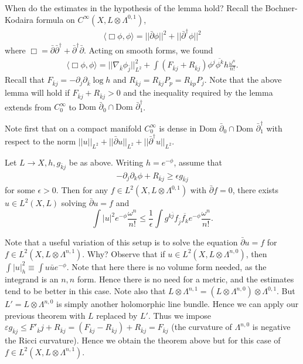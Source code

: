 \documentclass{../mathnotes}
\begin{document}
When do the estimates in the hypothesis of the lemma hold? Recall the Bochner-Kodaira formula on $C^\infty(X,L\otimes\Lambda^{0,1})$,
\begin{align*}
    \langle\Box\phi,\phi\rangle=||\bar\partial \phi||^2+||\bar\partial^\dagger \phi||^2
\end{align*}
where $\Box=\bar\partial\bar\partial^\dagger+\bar\partial^\dagger\bar\partial$. Acting on smooth forms, we found
\begin{align*}
    \langle\Box\phi,\phi\rangle=||\nabla_{\bar k}\phi_{\bar j}||^2_{L^2}+\int(F_{\bar kj}+R_{\bar kj})\phi^j\overline{\phi^k}h\frac{\omega^n}{n!}.
\end{align*}
Recall that $F_{\bar kj}=-\partial_j\partial_{\bar k}\log h$ and $R_{\bar kj}=R_{\bar kj}P_p=R_{\bar kp}P_j$.
Note that the above lemma will hold if $F_{\bar kj}+R_{\bar kj}>0$ and the inequality required by the lemma extends
from $C_0^\infty$ to $\text{Dom }\bar\partial_0\cap\text{Dom }\bar\partial_1^\dagger$.

Note first that on a compact manifold $C^\infty_0$ is dense in $\text{Dom }\bar\partial_0\cap\text{Dom }\bar\partial_1^\dagger$ with respect
to the norm $||u||_{L^2}+||\bar\partial u||_{L^2}+||\bar\partial^\dagger u||_{L^2}$.

\begin{thm}
    Let $L\to X,h,g_{\bar kj}$ be as above. Writing $h=e^{-\phi}$, assume that
    \begin{align*}
        -\partial_j\partial_k\phi+ R_{\bar kj}\geq\epsilon g_{\bar kj}
    \end{align*}
    for some $\epsilon>0$. Then for any $f\in L^2(X,L\otimes\Lambda^{0,1})$ with $\bar\partial f=0$, there exists
    $u\in L^2(X,L)$ solving $\bar\partial u=f$ and
    \[\int |u|^2e^{-\phi}\frac{\omega^n}{n!}\leq\frac{1}{\epsilon}\int g^{k\bar j}f_{\bar j}\overline{f_k}e^{-\phi}\frac{\omega^n}{n!}.\]
\end{thm}

Note that a useful variation of this setup is to solve the equation $\bar\partial u=f$ for $f\in L^2(X,L\otimes\Lambda^{n,1})$. Why?
Observe that if $u\in L^2(X,L\otimes\Lambda^{n,0})$, then $\int|u|^2_h\equiv\int u\bar ue^{-\phi}$. Note that here there is no volume form
needed, as the integrand is an $n,n$ form. Hence there is no need for a metric, and the estimates tend to be better in this case.
Note also that $L\otimes\Lambda^{n,1}=(L\otimes\Lambda^{n,0})\otimes\Lambda^{0,1}$. But $L'=L\otimes\Lambda^{n,0}$ is simply
another holomorphic line bundle. Hence we can apply our previous theorem with $L$ replaced by $L'$. Thus we impose
$\varepsilon g_{\bar kj}\leq F'_{\bar k}j+R_{\bar kj}=(F_{\bar kj}-R_{\bar kj})+R_{\bar kj}=F_{\bar kj}$ (the curvature of $\Lambda^{n,0}$ is negative
the Ricci curvature). Hence we obtain the theorem above but for this case of $f\in L^2(X,L\otimes\Lambda^{n,1})$.
\end{document}
